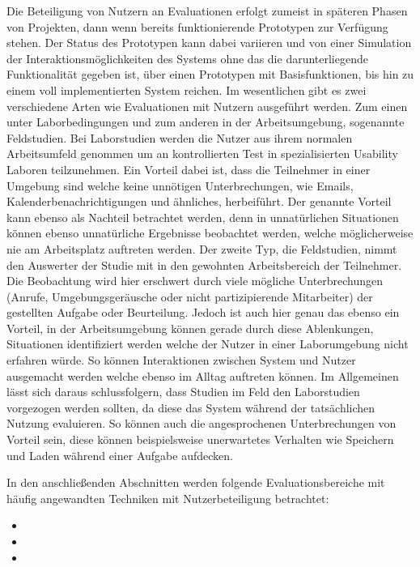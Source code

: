 \documentclass[draft=false
              ,paper=a4
              ,twoside=false
              ,fontsize=11pt
              ,headsepline
              ,BCOR10mm
              ,DIV11
              ]{scrbook}
\begin{document}
Die Beteiligung von Nutzern an Evaluationen erfolgt zumeist in späteren Phasen von Projekten, dann wenn bereits funktionierende Prototypen zur Verfügung stehen. Der Status des Prototypen kann dabei variieren und von einer Simulation der Interaktionsmöglichkeiten des Systems ohne das die darunterliegende Funktionalität gegeben ist, über einen Prototypen mit Basisfunktionen, bis hin zu einem voll implementierten System reichen.
Im wesentlichen gibt es zwei verschiedene Arten wie Evaluationen mit Nutzern ausgeführt werden. Zum einen unter Laborbedingungen und zum anderen in der Arbeitsumgebung, sogenannte Feldstudien. Bei Laborstudien werden die Nutzer aus ihrem normalen Arbeitsumfeld genommen um an kontrollierten Test in spezialisierten Usability Laboren teilzunehmen. Ein Vorteil dabei ist, dass die Teilnehmer in einer Umgebung sind welche keine unnötigen Unterbrechungen, wie Emails, Kalenderbenachrichtigungen und ähnliches, herbeiführt. Der genannte Vorteil kann ebenso als Nachteil betrachtet werden, denn in unnatürlichen Situationen können ebenso unnatürliche Ergebnisse beobachtet werden, welche möglicherweise nie am Arbeitsplatz auftreten werden.
Der zweite Typ, die Feldstudien, nimmt den Auswerter der Studie mit in den gewohnten Arbeitsbereich der Teilnehmer. Die Beobachtung wird hier erschwert durch viele mögliche Unterbrechungen (Anrufe, Umgebungsgeräusche oder nicht partizipierende Mitarbeiter) der gestellten Aufgabe oder Beurteilung. Jedoch ist auch hier genau das ebenso ein Vorteil, in der Arbeitsumgebung können gerade durch diese Ablenkungen, Situationen identifiziert werden welche der Nutzer in einer Laborumgebung nicht erfahren würde. So können Interaktionen zwischen System und Nutzer ausgemacht werden welche ebenso im Alltag auftreten können. 
Im Allgemeinen lässt sich daraus schlussfolgern, dass Studien im Feld den Laborstudien vorgezogen werden sollten, da diese das System während der tatsächlichen Nutzung evaluieren. So können auch die angesprochenen Unterbrechungen von Vorteil sein, diese können beispielsweise unerwartetes Verhalten wie Speichern und Laden während einer Aufgabe aufdecken. 

In den anschließenden Abschnitten werden folgende Evaluationsbereiche mit häufig angewandten Techniken mit Nutzerbeteiligung betrachtet:

\begin{itemize}
  \item {}
  \item {}
  \item {}
\end{itemize}
\end{document}
